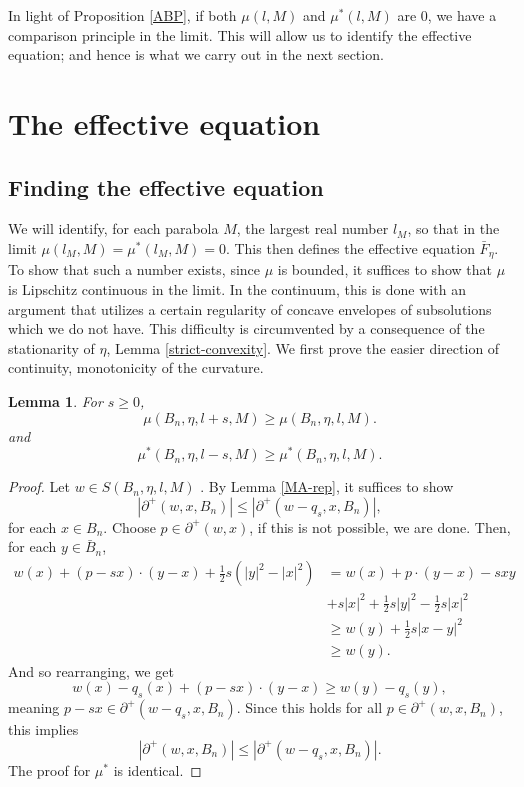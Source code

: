 \documentclass[12pt]{amsart}
\newtheorem{lemma}[theorem]{Lemma}
\begin{document}
In light of Proposition \ref{ABP}, if both $\mu(l,M)$ and $\mu^*(l,M)$ are 0, we have a comparison principle in the limit. This will allow 
us to identify the effective equation; and hence is what we carry out in the next section.

\section{The effective equation} \label{sec:identify}

\subsection{Finding the effective equation}  \label{subsec:identify}
We will identify, for each parabola $M$, the largest real number $l_M$, so that in the limit 
$\mu(l_M,M) = \mu^*(l_M,M) = 0$. This then defines the effective equation $\bar{F}_{\eta}$. To show that such a number 
exists, since $\mu$ is bounded, it suffices to show that $\mu$ is Lipschitz continuous in the limit. In the continuum, 
this is done with an argument that utilizes a certain regularity of concave envelopes of subsolutions which we do not have. 
This difficulty is circumvented by a consequence of the stationarity of $\eta$, Lemma \ref{strict-convexity}. 
We first prove the easier direction of continuity, monotonicity of the curvature. 
 \begin{lemma}\label{monotonicity} 
For $s \geq 0$, 
\[
\mu(B_n, \eta, l + s ,M) \geq \mu(B_n, \eta, l, M).
\]
and 
\[
\mu^*(B_n, \eta, l-s, M) \geq \mu^*(B_n, \eta, l, M). 
\]
\end{lemma} 

\begin{proof}
Let $w \in S(B_n, \eta, l, M)$ . By Lemma \ref{MA-rep},  it suffices to show 
\[
|\partial^+(w, x, B_n)| \leq |\partial^+(w - q_s, x, B_n)|,
\]
for each $x \in B_n$. Choose $p \in \partial^+(w, x)$, if this is not possible, we are done. 
Then,  for each $y \in \bar{B}_n$, 
\begin{align*}
w(x) +  (p - s x ) \cdot(y-x)  + \frac{1}{2} s (|y|^2 - |x|^2)  &= w(x) + p \cdot(y-x) - s x y \\
&+ s |x|^2 + \frac{1}{2} s |y|^2 - \frac{1}{2} s |x|^2 \\
&\geq w(y) + \frac{1}{2} s  |x - y|^2 \\
&\geq w(y).
\end{align*}
And so rearranging, we get 
\[
w(x) - q_s(x) +  (p - s x) \cdot(y-x)  \geq w(y) -q_s(y), 
\]
meaning $p - sx \in \partial^+(w-q_s, x, B_n)$. Since this holds for all $p \in \partial^+(w,x,B_n)$, this implies 
\[
|\partial^+(w, x, B_n)| \leq |\partial^+(w - q_s, x, B_n)|. 
\]
The proof for $\mu^*$ is identical. 
\end{proof}
\end{document}
